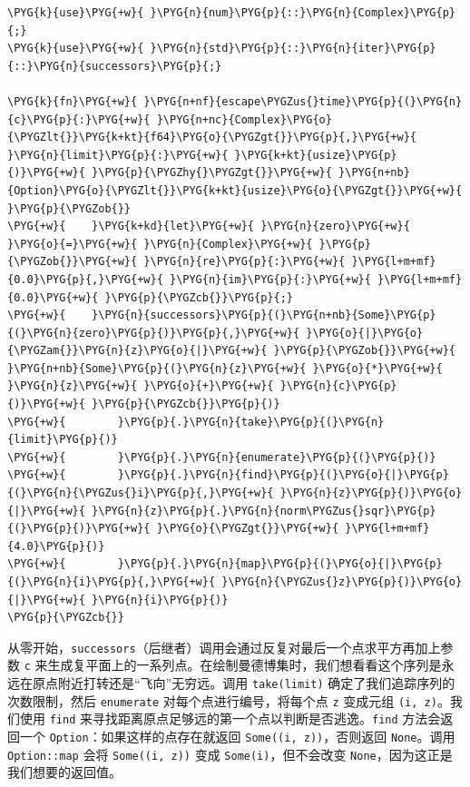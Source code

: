 \begin{Verbatim}[commandchars=\\\{\},breaklines=true,breakanywhere=true,fontsize=\codefont,xleftmargin=17bp]
\PYG{k}{use}\PYG{+w}{ }\PYG{n}{num}\PYG{p}{::}\PYG{n}{Complex}\PYG{p}{;}
\PYG{k}{use}\PYG{+w}{ }\PYG{n}{std}\PYG{p}{::}\PYG{n}{iter}\PYG{p}{::}\PYG{n}{successors}\PYG{p}{;}

\PYG{k}{fn}\PYG{+w}{ }\PYG{n+nf}{escape\PYGZus{}time}\PYG{p}{(}\PYG{n}{c}\PYG{p}{:}\PYG{+w}{ }\PYG{n+nc}{Complex}\PYG{o}{\PYGZlt{}}\PYG{k+kt}{f64}\PYG{o}{\PYGZgt{}}\PYG{p}{,}\PYG{+w}{ }\PYG{n}{limit}\PYG{p}{:}\PYG{+w}{ }\PYG{k+kt}{usize}\PYG{p}{)}\PYG{+w}{ }\PYG{p}{\PYGZhy{}\PYGZgt{}}\PYG{+w}{ }\PYG{n+nb}{Option}\PYG{o}{\PYGZlt{}}\PYG{k+kt}{usize}\PYG{o}{\PYGZgt{}}\PYG{+w}{ }\PYG{p}{\PYGZob{}}
\PYG{+w}{    }\PYG{k+kd}{let}\PYG{+w}{ }\PYG{n}{zero}\PYG{+w}{ }\PYG{o}{=}\PYG{+w}{ }\PYG{n}{Complex}\PYG{+w}{ }\PYG{p}{\PYGZob{}}\PYG{+w}{ }\PYG{n}{re}\PYG{p}{:}\PYG{+w}{ }\PYG{l+m+mf}{0.0}\PYG{p}{,}\PYG{+w}{ }\PYG{n}{im}\PYG{p}{:}\PYG{+w}{ }\PYG{l+m+mf}{0.0}\PYG{+w}{ }\PYG{p}{\PYGZcb{}}\PYG{p}{;}
\PYG{+w}{    }\PYG{n}{successors}\PYG{p}{(}\PYG{n+nb}{Some}\PYG{p}{(}\PYG{n}{zero}\PYG{p}{)}\PYG{p}{,}\PYG{+w}{ }\PYG{o}{|}\PYG{o}{\PYGZam{}}\PYG{n}{z}\PYG{o}{|}\PYG{+w}{ }\PYG{p}{\PYGZob{}}\PYG{+w}{ }\PYG{n+nb}{Some}\PYG{p}{(}\PYG{n}{z}\PYG{+w}{ }\PYG{o}{*}\PYG{+w}{ }\PYG{n}{z}\PYG{+w}{ }\PYG{o}{+}\PYG{+w}{ }\PYG{n}{c}\PYG{p}{)}\PYG{+w}{ }\PYG{p}{\PYGZcb{}}\PYG{p}{)}
\PYG{+w}{        }\PYG{p}{.}\PYG{n}{take}\PYG{p}{(}\PYG{n}{limit}\PYG{p}{)}
\PYG{+w}{        }\PYG{p}{.}\PYG{n}{enumerate}\PYG{p}{(}\PYG{p}{)}
\PYG{+w}{        }\PYG{p}{.}\PYG{n}{find}\PYG{p}{(}\PYG{o}{|}\PYG{p}{(}\PYG{n}{\PYGZus{}i}\PYG{p}{,}\PYG{+w}{ }\PYG{n}{z}\PYG{p}{)}\PYG{o}{|}\PYG{+w}{ }\PYG{n}{z}\PYG{p}{.}\PYG{n}{norm\PYGZus{}sqr}\PYG{p}{(}\PYG{p}{)}\PYG{+w}{ }\PYG{o}{\PYGZgt{}}\PYG{+w}{ }\PYG{l+m+mf}{4.0}\PYG{p}{)}
\PYG{+w}{        }\PYG{p}{.}\PYG{n}{map}\PYG{p}{(}\PYG{o}{|}\PYG{p}{(}\PYG{n}{i}\PYG{p}{,}\PYG{+w}{ }\PYG{n}{\PYGZus{}z}\PYG{p}{)}\PYG{o}{|}\PYG{+w}{ }\PYG{n}{i}\PYG{p}{)}
\PYG{p}{\PYGZcb{}}
\end{Verbatim}

从零开始，\texttt{successors}（后继者）调用会通过反复对最后一个点求平方再加上参数 \texttt{c} 来生成复平面上的一系列点。在绘制曼德博集时，我们想看看这个序列是永远在原点附近打转还是“飞向”无穷远。调用 \texttt{take(limit)} 确定了我们追踪序列的次数限制，然后 \texttt{enumerate} 对每个点进行编号，将每个点 \texttt{z} 变成元组 \texttt{(i, z)}。我们使用 \texttt{find} 来寻找距离原点足够远的第一个点以判断是否逃逸。\texttt{find} 方法会返回一个 \texttt{Option}：如果这样的点存在就返回 \texttt{Some((i, z))}，否则返回 \texttt{None}。调用 \texttt{Option::map} 会将 \texttt{Some((i, z))} 变成 \texttt{Some(i)}，但不会改变 \texttt{None}，因为这正是我们想要的返回值。

